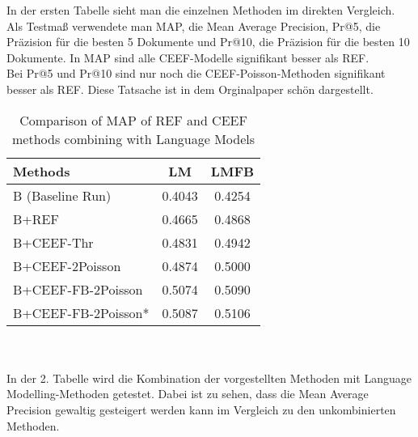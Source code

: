 In der ersten Tabelle sieht man die einzelnen Methoden im direkten Vergleich. Als Testmaß verwendete man MAP, die Mean Average Precision, Pr@5, die Präzision für die besten 5 Dokumente und Pr@10, die Präzision für die besten 10 Dokumente. In MAP sind alle CEEF-Modelle signifikant besser als REF.\\
Bei Pr@5 und Pr@10 sind nur noch die CEEF-Poisson-Methoden signifikant besser als REF. Diese Tatsache ist in dem Orginalpaper \NgNa\cite{paper:Na} schön dargestellt.\\
\begin{table}[h]
	\centering
	\begin{tabular}{lS[tabnumalign=centre,tabformat=1.4,decimalsymbol=comma]S[tabnumalign=centre,tabformat=1.4,decimalsymbol=comma]}
		\toprule
		Methods & {LM} & {LMFB} \\
		\midrule
		B (Baseline Run) & 0.4043 & 0.4254 \\
		B+REF & 0.4665 & 0.4868 \\
		B+CEEF-Thr & 0.4831 & 0.4942 \\
		B+CEEF-2Poisson & 0.4874 & 0.5000 \\
		B+CEEF-FB-2Poisson & 0.5074 & 0.5090 \\
		B+CEEF-FB-2Poisson* & 0.5087 & 0.5106 \\
		\bottomrule
	\end{tabular}
	\caption{Comparison of MAP of REF and CEEF methods combining with Language Models}
	\cite{paper:Na}
\end{table}\\
\\
In der 2. Tabelle wird die Kombination der vorgestellten Methoden mit Language Modelling-Methoden getestet. Dabei ist zu sehen, dass die Mean Average Precision gewaltig gesteigert werden kann im Vergleich zu den unkombinierten Methoden.
